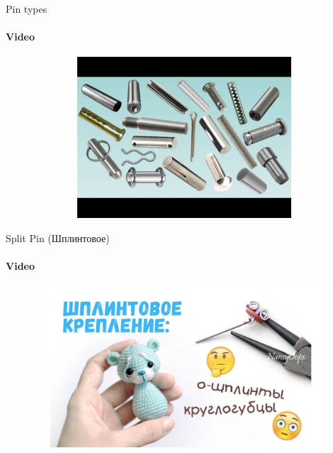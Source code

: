 \documentclass[aspectratio=169]{beamer}
\begin{document}
\begin{frame}[t]{Pin types}
    \framesubtitle{Video}
    \vspace{-0.6cm}
    \begin{figure}[H]
        \href{https://youtu.be/W-0ZV9zXpc0}{
            \centering\includegraphics[height=6cm,width=1\textwidth,keepaspectratio]{pin_types_video.jpg}}
        \label{fig:pin_types_video.jpg}
    \end{figure}
\end{frame}

\begin{frame}[t]{Split Pin (Шплинтовое)}
    \framesubtitle{Video}
    \vspace{-0.6cm}
    \begin{figure}[H]
        \href{https://youtu.be/SpY0tJMY0hg}{
            \centering\includegraphics[height=6cm,width=1\textwidth,keepaspectratio]{splint_pin_video.jpg}}
        \label{fig:splint_pin_video.jpg}
    \end{figure}
\end{frame}
\end{document}
